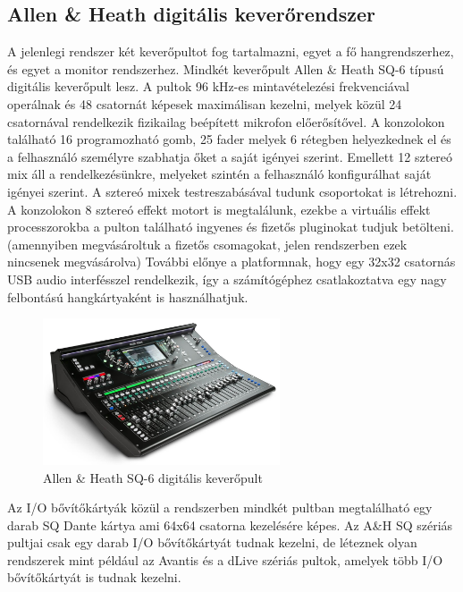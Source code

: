 \subsection{Allen \& Heath digitális keverőrendszer}
A jelenlegi rendszer két keverőpultot fog tartalmazni, egyet a fő hangrendszerhez, és egyet a monitor rendszerhez.
Mindkét keverőpult Allen \& Heath SQ-6 típusú digitális keverőpult lesz.
A pultok 96 kHz-es mintavételezési frekvenciával operálnak és 48 csatornát képesek maximálisan kezelni, melyek közül 
24 csatornával rendelkezik fizikailag beépített mikrofon előerősítővel. A konzolokon található 16 programozható gomb,
25 fader melyek 6 rétegben helyezkednek el és a felhasználó személyre szabhatja őket a saját igényei szerint. 
Emellett 12 sztereó mix áll a rendelkezésünkre, melyeket szintén a felhasználó konfigurálhat saját igényei szerint.
A sztereó mixek testreszabásával tudunk csoportokat is létrehozni.
A konzolokon 8 sztereó effekt motort is megtalálunk, ezekbe a virtuális effekt processzorokba a pulton található ingyenes és fizetős 
pluginokat tudjuk betölteni. (amennyiben megvásároltuk a fizetős csomagokat, jelen rendszerben ezek nincsenek megvásárolva)
További előnye a platformnak, hogy egy 32x32 csatornás USB audio interfésszel rendelkezik, így a számítógéphez csatlakoztatva
egy nagy felbontású hangkártyaként is használhatjuk.~\cite{AHSQ}
\begin{figure}[H]
	\centering
	\includegraphics[width=70mm, keepaspectratio]{figures/sq6.jpg}
	\caption{Allen \& Heath SQ-6 digitális keverőpult}\label{fig:sq6}
\end{figure}
Az I/O bővítőkártyák közül a rendszerben mindkét pultban megtalálható egy darab SQ Dante kártya ami 64x64 csatorna
kezelésére képes. Az A\&H SQ szériás pultjai csak egy darab I/O bővítőkártyát tudnak kezelni, de léteznek
olyan rendszerek mint például az Avantis és a dLive szériás pultok, amelyek több I/O bővítőkártyát is tudnak kezelni.
